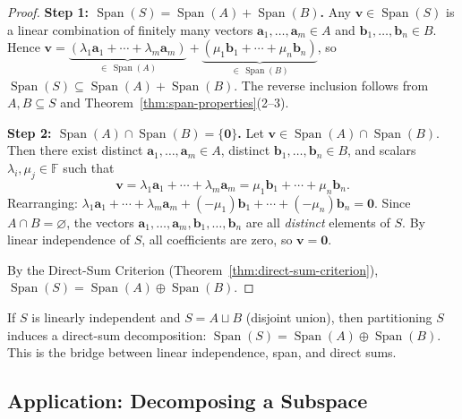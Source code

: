 \documentclass[11pt, a4paper, notitlepage]{report}
\theoremstyle{definition}
\theoremstyle{remark}
\begin{document}
\begin{proof}
\textbf{Step 1: $\operatorname{Span}(S) = \operatorname{Span}(A) + \operatorname{Span}(B)$.} Any $\mathbf{v} \in \operatorname{Span}(S)$ is a linear combination of finitely many vectors $\mathbf{a}_1,\ldots,\mathbf{a}_m \in A$ and $\mathbf{b}_1,\ldots,\mathbf{b}_n \in B$. Hence $\mathbf{v} = \underbrace{(\lambda_1\mathbf{a}_1 + \cdots + \lambda_m\mathbf{a}_m)}_{\in\,\operatorname{Span}(A)} + \underbrace{(\mu_1\mathbf{b}_1 + \cdots + \mu_n\mathbf{b}_n)}_{\in\,\operatorname{Span}(B)}$, so $\operatorname{Span}(S) \subseteq \operatorname{Span}(A) + \operatorname{Span}(B)$. The reverse inclusion follows from $A,B \subseteq S$ and Theorem~\ref{thm:span-properties}(2--3).

\textbf{Step 2: $\operatorname{Span}(A) \cap \operatorname{Span}(B) = \{\mathbf{0}\}$.} Let $\mathbf{v} \in \operatorname{Span}(A) \cap \operatorname{Span}(B)$. Then there exist distinct $\mathbf{a}_1,\ldots,\mathbf{a}_m \in A$, distinct $\mathbf{b}_1,\ldots,\mathbf{b}_n \in B$, and scalars $\lambda_i, \mu_j \in \mathbb{F}$ such that
\[
  \mathbf{v} = \lambda_1\mathbf{a}_1 + \cdots + \lambda_m\mathbf{a}_m = \mu_1\mathbf{b}_1 + \cdots + \mu_n\mathbf{b}_n.
\]
Rearranging: $\lambda_1\mathbf{a}_1 + \cdots + \lambda_m\mathbf{a}_m + (-\mu_1)\mathbf{b}_1 + \cdots + (-\mu_n)\mathbf{b}_n = \mathbf{0}$. Since $A \cap B = \varnothing$, the vectors $\mathbf{a}_1,\ldots,\mathbf{a}_m,\mathbf{b}_1,\ldots,\mathbf{b}_n$ are all \emph{distinct} elements of $S$. By linear independence of $S$, all coefficients are zero, so $\mathbf{v} = \mathbf{0}$.

By the Direct-Sum Criterion (Theorem~\ref{thm:direct-sum-criterion}), $\operatorname{Span}(S) = \operatorname{Span}(A) \oplus \operatorname{Span}(B)$.
\end{proof}

\begin{keyresult}[title={Key Result: Three-Concepts-in-One}]
If $S$ is linearly independent and $S = A \sqcup B$ (disjoint union), then partitioning $S$ induces a direct-sum decomposition: $\operatorname{Span}(S) = \operatorname{Span}(A) \oplus \operatorname{Span}(B)$. This is the bridge between linear independence, span, and direct sums.
\end{keyresult}

\subsection{Application: Decomposing a Subspace}
\end{document}
